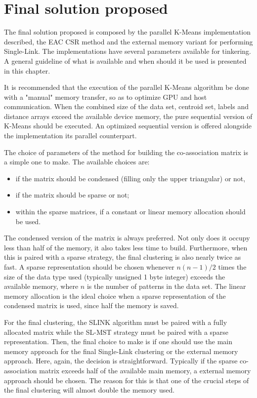 \chapter{Final solution proposed}
\label{chapter:solution}

The final solution proposed is composed by the parallel K-Means implementation described, the EAC CSR method and the external memory variant for performing Single-Link.
The implementations have several parameters available for tinkering.
A general guideline of what is available and when should it be used is presented in this chapter.

It is recommended that the execution of the parallel K-Means algorithm be done with a "manual" memory transfer, so as to optimize GPU and host communication.
When the combined size of the data set, centroid set, labels and distance arrays exceed the available device memory, the pure sequential version of K-Means should be executed.
An optimized sequential version is offered alongside the implementation its parallel counterpart.

The choice of parameters of the method for building the co-association matrix is a simple one to make.
The available choices are:

\begin{itemize}
	\item if the matrix should be condensed (filling only the upper triangular) or not, 
	\item if the matrix should be sparse or not;
	\item within the sparse matrices, if a constant or linear memory allocation should be used.
\end{itemize}

The condensed version of the matrix is always preferred.
Not only does it occupy less than half of the memory, it also takes less time to build.
Furthermore, when this is paired with a sparse strategy, the final clustering is also nearly twice as fast.
A sparse representation should be chosen whenever $n (n-1) / 2$ times the size of the data type used (typically unsigned 1 byte integer) exceeds the available memory, where $n$ is the number of patterns in the data set.
The linear memory allocation is the ideal choice when a sparse representation of the condensed matrix is used, since half the memory is saved.

For the final clustering, the SLINK algorithm must be paired with a fully allocated matrix while the SL-MST strategy must be paired with a sparse representation.
Then, the final choice to make is if one should use the main memory approach for the final Single-Link clustering or the external memory approach.
Here, again, the decision is straightforward.
Typically if the sparse co-association matrix exceeds half of the available main memory, a external memory approach should be chosen.
The reason for this is that one of the crucial steps of the final clustering will almost double the memory used.